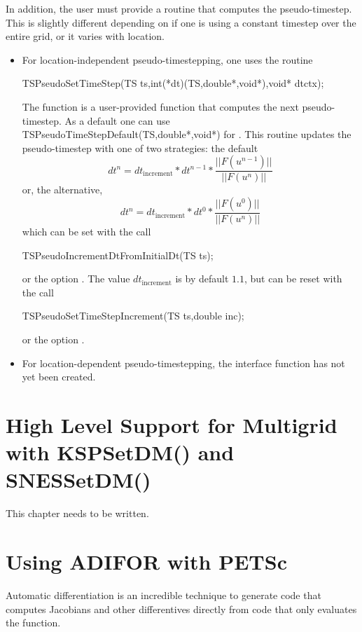 In addition, the user must provide a routine that computes the
pseudo-timestep. This is slightly different depending on if
one is using a constant timestep over the entire grid, or it varies
with location.
\begin{itemize}
\item For location-independent pseudo-timestepping, one uses the routine
\begin{tabbing}
 TSPseudoSetTimeStep(TS ts,int(*dt)(TS,double*,void*),void* dtctx);
\end{tabbing}
The function  is a user-provided function that computes the next
pseudo-timestep. As a default one can use
TSPseudoTimeStepDefault(TS,double*,void*) for . This routine
updates the pseudo-timestep with one of two strategies: the default
\[
   dt^{n} = dt_{\mathrm{increment}}*dt^{n-1}*\frac{|| F(u^{n-1}) ||}{|| F(u^{n})||}
\]
or, the alternative,
\[
   dt^{n} = dt_{\mathrm{increment}}*dt^{0}*\frac{|| F(u^{0}) ||}{|| F(u^{n})||}
\]
which can be set with the call
\begin{tabbing}
 TSPseudoIncrementDtFromInitialDt(TS ts);
\end{tabbing}
or
the option .
The value $ dt_{\mathrm{increment}} $ is by default $ 1.1$, but can be reset with the
call
\begin{tabbing}
 TSPseudoSetTimeStepIncrement(TS ts,double inc);
\end{tabbing}
or  the option
. 


\item For location-dependent pseudo-timestepping, the interface function
      has not yet been created.
\end{itemize}



\cleardoublepage
\chapter{High Level Support for Multigrid with KSPSetDM() and SNESSetDM()}
\label{chapter_kspdm}

This chapter needs to be written.


\cleardoublepage
\chapter{Using ADIFOR with PETSc}

Automatic differentiation is an incredible technique to generate code
that computes Jacobians and other differentives directly from code
that only evaluates the function.

